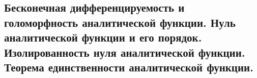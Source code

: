 \subsection{Бесконечная дифференцируемость и голоморфность аналитической функции. Нуль аналитической функции и его порядок. Изолированность нуля аналитической функции. Теорема единственности аналитической функции.}

